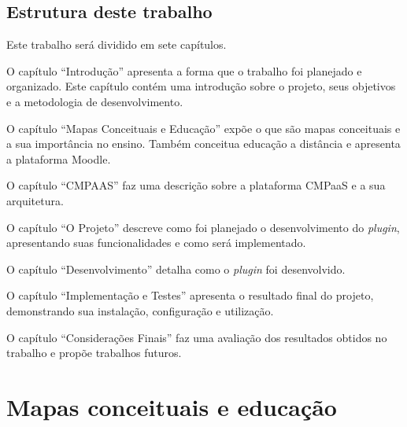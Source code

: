 \documentclass[
	12pt,				%
	openright,			%
	oneside,			%
	a4paper,			%
	english,			%
	french,				%
	spanish,			%
	brazil				%
	]{abntex2}
\begin{document}
\section{Estrutura deste trabalho}

Este trabalho será dividido em sete capítulos.

O capítulo ``Introdução'' apresenta a forma que o trabalho foi planejado e organizado. Este capítulo contém uma introdução sobre o projeto, seus objetivos e a metodologia de desenvolvimento.

O capítulo ``Mapas Conceituais e Educação'' expõe o que são mapas conceituais e a sua importância no ensino. Também conceitua educação a distância e apresenta a plataforma Moodle.

O capítulo ``CMPAAS'' faz uma descrição sobre a  plataforma CMPaaS e a sua arquitetura.

O capítulo ``O Projeto'' descreve como foi planejado o desenvolvimento do \textit{plugin}, apresentando suas funcionalidades e como será implementado.

O capítulo ``Desenvolvimento'' detalha como o \textit{plugin} foi desenvolvido.

O capítulo ``Implementação e Testes'' apresenta o resultado final do projeto, demonstrando sua instalação, configuração e utilização.

O capítulo ``Considerações Finais'' faz uma avaliação dos resultados obtidos no trabalho e propõe trabalhos futuros.





\chapter{Mapas conceituais e educação}\label{cap-maps}
\end{document}
